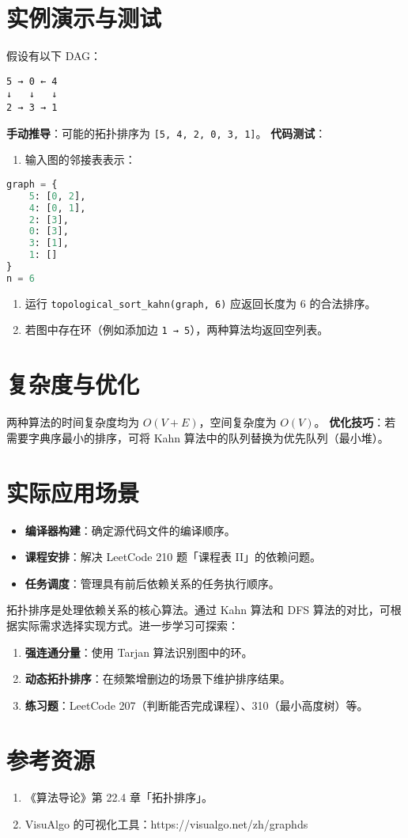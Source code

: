 \chapter{实例演示与测试}
假设有以下 DAG：\par
\begin{lstlisting}
5 → 0 ← 4
↓   ↓   ↓
2 → 3 → 1
\end{lstlisting}
\textbf{手动推导}：可能的拓扑排序为 \verb![5, 4, 2, 0, 3, 1]!。
\textbf{代码测试}：\par
\begin{enumerate}
\item 输入图的邻接表表示：
\end{enumerate}
\begin{lstlisting}[language=python]
graph = {
    5: [0, 2],
    4: [0, 1],
    2: [3],
    0: [3],
    3: [1],
    1: []
}
n = 6
\end{lstlisting}
\begin{enumerate}
\item 运行 \verb!topological_sort_kahn(graph, 6)! 应返回长度为 6 的合法排序。
\item 若图中存在环（例如添加边 \verb!1 → 5!），两种算法均返回空列表。
\end{enumerate}
\chapter{复杂度与优化}
两种算法的时间复杂度均为 $O(V + E)$，空间复杂度为 $O(V)$。
\textbf{优化技巧}：若需要字典序最小的排序，可将 Kahn 算法中的队列替换为优先队列（最小堆）。\par
\chapter{实际应用场景}
\begin{itemize}
\item \textbf{编译器构建}：确定源代码文件的编译顺序。
\item \textbf{课程安排}：解决 LeetCode 210 题「课程表 II」的依赖问题。
\item \textbf{任务调度}：管理具有前后依赖关系的任务执行顺序。
\end{itemize}
拓扑排序是处理依赖关系的核心算法。通过 Kahn 算法和 DFS 算法的对比，可根据实际需求选择实现方式。进一步学习可探索：\par
\begin{enumerate}
\item \textbf{强连通分量}：使用 Tarjan 算法识别图中的环。
\item \textbf{动态拓扑排序}：在频繁增删边的场景下维护排序结果。
\item \textbf{练习题}：LeetCode 207（判断能否完成课程）、310（最小高度树）等。
\end{enumerate}
\chapter{参考资源}
\begin{enumerate}
\item 《算法导论》第 22.4 章「拓扑排序」。
\item VisuAlgo 的可视化工具：https://visualgo.net/zh/graphds
\end{enumerate}

